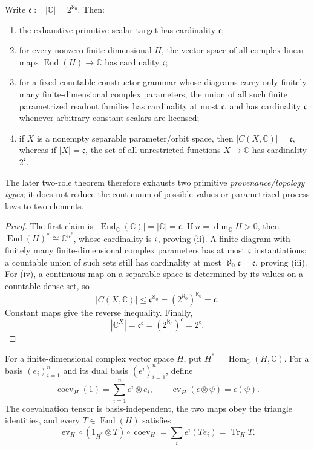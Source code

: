 \documentclass[12pt,a4paper]{article}
\begin{document}
\begin{corollary}
\label{p2:cor:finite-readout-cardinality}
Write \(\mathfrak c:=|\mathbb C|=2^{\aleph_0}\).  Then:
\begin{enumerate}[label=(\roman*),leftmargin=2em]
\item the exhaustive primitive scalar target has cardinality
\(\mathfrak c\);
\item for every nonzero finite-dimensional \(H\), the vector space of all
complex-linear maps
\(\operatorname{End}(H)\to\mathbb C\) has cardinality \(\mathfrak c\);
\item for a fixed countable constructor grammar whose diagrams carry only
finitely many finite-dimensional complex parameters, the union of all such
finite parametrized readout families has cardinality at most
\(\mathfrak c\), and has cardinality \(\mathfrak c\) whenever arbitrary
constant scalars are licensed;
\item if \(X\) is a nonempty separable parameter/orbit space, then
\(|C(X,\mathbb C)|=\mathfrak c\), whereas if \(|X|=\mathfrak c\), the set of
all unrestricted functions \(X\to\mathbb C\) has cardinality
\(2^{\mathfrak c}\).
\end{enumerate}
The later two-role theorem therefore exhausts two primitive
\emph{provenance/topology types}; it does not reduce the continuum of
possible values or parametrized process laws to two elements.
\end{corollary}

\begin{proof}
The first claim is
\(|\operatorname{End}_{\mathbb C}(\mathbb C)|=|\mathbb C|=\mathfrak c\).
If \(n=\dim_{\mathbb C}H>0\), then
\(\operatorname{End}(H)^*\cong\mathbb C^{n^2}\), whose cardinality is
\(\mathfrak c\), proving (ii).  A finite diagram with finitely many
finite-dimensional complex parameters has at most \(\mathfrak c\)
instantiations; a countable union of such sets still has cardinality at most
\(\aleph_0\mathfrak c=\mathfrak c\), proving (iii).  For (iv), a continuous
map on a separable space is determined by its values on a countable dense
set, so
\[
 |C(X,\mathbb C)|\le\mathfrak c^{\aleph_0}
 =(2^{\aleph_0})^{\aleph_0}=\mathfrak c.
\]
Constant maps give the reverse inequality.  Finally,
\[
 |\mathbb C^X|=\mathfrak c^{\mathfrak c}
 =(2^{\aleph_0})^{\mathfrak c}=2^{\mathfrak c}.
\]
\end{proof}

\begin{lemma}
\label{p2:lem:canonical-finite-duality-trace}
For a finite-dimensional complex vector space \(H\), put
\(H^*=\operatorname{Hom}_{\mathbb C}(H,\mathbb C)\).  For a basis
\((e_i)_{i=1}^n\) and its dual basis \((e^i)_{i=1}^n\), define
\[
 \operatorname{coev}_H(1)=\sum_{i=1}^n e^i\otimes e_i,
 \qquad
 \operatorname{ev}_H(\epsilon\otimes\psi)=\epsilon(\psi).
\]
The coevaluation tensor is basis-independent, the two maps obey the triangle
identities, and every \(T\in\operatorname{End}(H)\) satisfies
\[
 \operatorname{ev}_H\circ(1_{H^*}\otimes T)
 \circ\operatorname{coev}_H
 =\sum_i e^i(Te_i)=\operatorname{Tr}_H T.
\]
\end{lemma}
\end{document}
